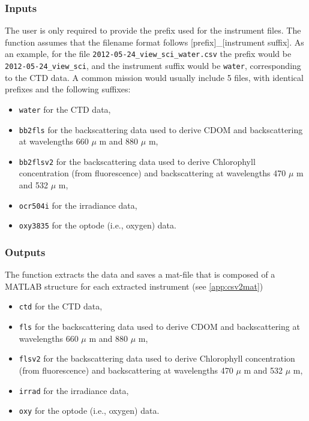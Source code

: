\documentclass[11pt,A4]{report}
\begin{document}
\subsubsection{Inputs}
The user is only required to provide the prefix used for the instrument files. The function assumes that the filename format follows [prefix]\_[instrument suffix]. As an example, for the file \texttt{2012-05-24\_view\_sci\_water.csv} the prefix would be \verb+2012-05-24_view_sci+, and the instrument suffix would be \texttt{water}, corresponding to the CTD data. A common mission would usually include 5 files, with identical prefixes and the following suffixes:
\begin{itemize}
\item \texttt{water} for the CTD data,
\item \texttt{bb2fls} for the backscattering data used to derive CDOM and backscattering at wavelengths 660 $\mu$ m and 880 $\mu$ m,
\item \texttt{bb2flsv2} for the backscattering data used to derive Chlorophyll concentration (from fluorescence) and backscattering at wavelengths 470 $\mu$ m and 532 $\mu$ m,
\item \texttt{ocr504i} for the irradiance data,
\item \texttt{oxy3835} for the optode (i.e., oxygen) data.
\end{itemize}

\subsubsection{Outputs}

The function extracts the data and saves a mat-file that is composed of a MATLAB structure for each extracted instrument (see \ref{app:csv2mat})
 \begin{itemize}
\item \texttt{ctd} for the CTD data,
\item \texttt{fls} for the backscattering data used to derive CDOM and backscattering at wavelengths 660 $\mu$ m and 880 $\mu$ m,
\item \texttt{flsv2} for the backscattering data used to derive Chlorophyll concentration (from fluorescence) and backscattering at wavelengths 470 $\mu$ m and 532 $\mu$ m,
\item \texttt{irrad} for the irradiance data,
\item \texttt{oxy} for the optode (i.e., oxygen) data.
\end{itemize}
\end{document}
